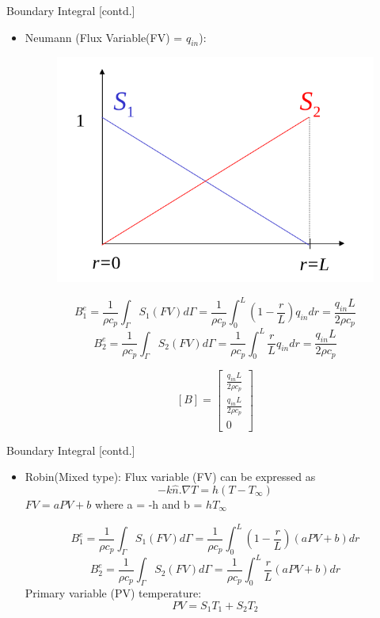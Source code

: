 \documentclass[t,english]{beamer}
\begin{document}
\begin{frame}{Boundary Integral [contd.]}
\begin{itemize}
\item Neumann (Flux Variable(FV) = $q_{in}$):\begin{figure}[ht!]
\includegraphics[trim=-1200 0 0 450,scale=0.15]{edge_shape_fun.png}
\end{figure}
$$B_1^e = \frac{1}{\rho c_p} \int_\Gamma S_1 (FV)d\Gamma = \frac{1}{\rho c_p}\int_0^L (1-\frac{r}{L}) q_{in}dr = \frac{q_{in} L}{2 \rho c_p} $$
$$B_2^e = \frac{1}{\rho c_p} \int_\Gamma S_2 (FV)d\Gamma = \frac{1}{\rho c_p} \int_0^L \frac{r}{L} q_{in}dr = \frac{q_{in} L}{2 \rho c_p} $$

$$[B] = \begin{bmatrix}
\frac{q_{in}L}{2 \rho c_p} \\
\frac{q_{in}L}{2 \rho c_p} \\
0
\end{bmatrix}$$ 
\end{itemize}
\end{frame}

\begin{frame}{Boundary Integral [contd.]}
\begin{itemize}
\item Robin(Mixed type):
Flux variable (FV) can be expressed as $$-k \hat{n}.\nabla T = h(T - T_{\infty})$$
$FV = a PV + b$ where a = -h and b = $hT_{\infty}$

$$B_1^e = \frac{1}{\rho c_p} \int_\Gamma S_1 (FV)d\Gamma = \frac{1}{\rho c_p} \int_0^L (1-\frac{r}{L}) (a PV + b)dr$$
$$B_2^e = \frac{1}{\rho c_p} \int_\Gamma S_2 (FV)d\Gamma = \frac{1}{\rho c_p} \int_0^L \frac{r}{L} (a PV + b)dr$$
Primary variable (PV) temperature: 
$$PV = S_1 T_1 + S_2 T_2$$
\end{itemize}
\end{frame}
\end{document}
